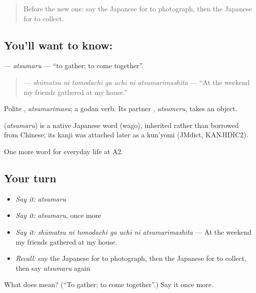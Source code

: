 \begin{quote}
Before the new one: say the Japanese for to photograph, then the Japanese for to collect.
\end{quote}

\subsection*{You'll want to know: }
\textbf{} — \emph{atsumaru} — \textquotedblleft{}to gather; to come together\textquotedblright{}.

\begin{quote}
\textbf{   } — \emph{shūmatsu ni tomodachi ga uchi ni atsumarimashita} — \textquotedblleft{}At the weekend my friends gathered at my house.\textquotedblright{}
\end{quote}

Polite \textbf{}, \emph{atsumarimasu}; a godan verb. Its partner \textbf{}, \emph{atsumeru}, takes an object.

\begin{cousinweb}
\textbf{} (\emph{atsumaru}) is a native Japanese word (wago), inherited rather than borrowed from Chinese; its kanji was attached later as a kun'yomi (JMdict, KANJIDIC2).
\end{cousinweb}

\begin{grammarlens}[title={What you've built}]
One more word for everyday life at A2.
\end{grammarlens}

\subsection*{Your turn}
\begin{itemize}
\raggedright
  \item \emph{Say it:} \emph{atsumaru}
  \item \emph{Say it:} \emph{atsumaru}, once more
  \item \emph{Say it:} \emph{shūmatsu ni tomodachi ga uchi ni atsumarimashita} — At the weekend my friends gathered at my house.
  \item \emph{Recall:} say the Japanese for to photograph, then the Japanese for to collect, then say \emph{atsumaru} again
\end{itemize}

\begin{tcolorbox}[breakable,colback=teal!4,colframe=teal!35!black,title={Before you move on}]
What does  mean? (\textquotedblleft{}To gather; to come together\textquotedblright{}.) Say it once more.
\end{tcolorbox}
